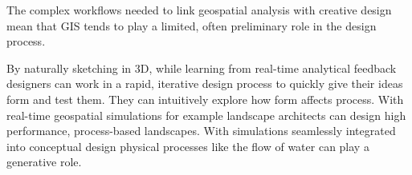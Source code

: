 \documentclass[Afour,sageh,times]{sagej}
\begin{document}
The complex workflows needed to link geospatial analysis with creative design
mean that GIS tends to play a limited, often preliminary role in the design process.



% 















By naturally sketching in 3D, while learning from real-time analytical feedback 
designers can work in a rapid, iterative design process 
to quickly give their ideas form and test them.
They can intuitively explore how form affects process. 
With real-time geospatial simulations for example
landscape architects can design high performance, process-based landscapes.
With simulations seamlessly integrated into conceptual design
physical processes like the flow of water 
can play a generative role. 
\end{document}
